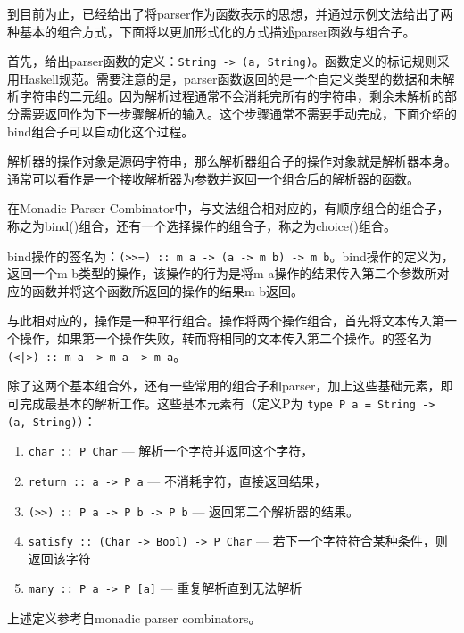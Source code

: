 到目前为止，已经给出了将parser作为函数表示的思想，并通过示例文法给出了两种基本的组合方式，下面将以更加形式化的方式描述parser函数与组合子。

首先，给出parser函数的定义：\texttt{String -> (a, String)}。函数定义的标记规则采用Haskell规范。需要注意的是，parser函数返回的是一个自定义类型的数据和未解析字符串的二元组。因为解析过程通常不会消耗完所有的字符串，剩余未解析的部分需要返回作为下一步骤解析的输入。这个步骤通常不需要手动完成，下面介绍的bind组合子可以自动化这个过程。

解析器的操作对象是源码字符串，那么解析器组合子的操作对象就是解析器本身。通常可以看作是一个接收解析器为参数并返回一个组合后的解析器的函数。

在Monadic Parser Combinator中，与文法组合相对应的，有顺序组合的组合子，称之为bind(\hsbind)组合，还有一个选择操作的组合子，称之为choice(\hschoice)组合。

bind操作的签名为：\texttt{(>>=) :: m a -> (a -> m b) -> m b}。bind操作的定义为，返回一个m b类型的操作，该操作的行为是将m a操作的结果传入第二个参数所对应的函数并将这个函数所返回的操作的结果m b返回。

与此相对应的，\hschoice{}操作是一种平行组合。\hschoice{}操作将两个操作组合，首先将文本传入第一个操作，如果第一个操作失败，转而将相同的文本传入第二个操作。\hschoice{}的签名为\texttt{(<|>) :: m a -> m a -> m a}。

除了这两个基本组合外，还有一些常用的组合子和parser，加上这些基础元素，即可完成最基本的解析工作。这些基本元素有（定义P为 \texttt{type P a = String -> (a, String)}）：

\begin{enumerate}
\item \texttt{char :: P Char} --- 解析一个字符并返回这个字符，
\item \texttt{return :: a -> P a}  --- 不消耗字符，直接返回结果，
\item \texttt{(>>) :: P a -> P b -> P b} --- 返回第二个解析器的结果。
\item \texttt{satisfy :: (Char -> Bool) -> P Char} --- 若下一个字符符合某种条件，则返回该字符
\item \texttt{many :: P a -> P [a]} --- 重复解析直到无法解析
\end{enumerate}

上述定义参考自monadic parser combinators\cite{hutton1996monadic}。

